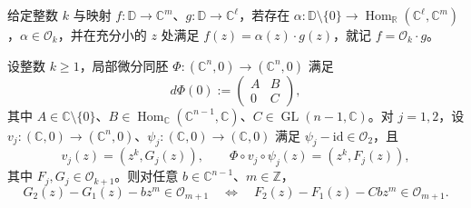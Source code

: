 给定整数 $k$ 与映射 $f:\mathbb D\to\mathbb C^m$、$g:\mathbb D\to\mathbb C^\ell$，若存在 $\alpha:\mathbb D\setminus\{0\}\to\operatorname{Hom}_{\mathbb R}(\mathbb C^\ell,\mathbb C^m)$，$\alpha\in\mathcal O_k$，并在充分小的 $z$ 处满足 $f(z)=\alpha(z)\cdot g(z)$，就记 $f=\mathcal O_k\cdot g$。

\begin{lemma}\label{lem:E-6-5}
设整数 $k\ge1$，局部微分同胚 $\Phi:(\mathbb C^n,0)\to(\mathbb C^n,0)$ 满足
\begin{equation}\label{eq:E-6-10}
  d\Phi(0):=\begin{pmatrix}A&B\\0&C\end{pmatrix},
\end{equation}
其中 $A\in\mathbb C\setminus\{0\}$、$B\in\operatorname{Hom}_{\mathbb C}(\mathbb C^{n-1},\mathbb C)$、$C\in\operatorname{GL}(n-1,\mathbb C)$。对 $j=1,2$，设 $v_j:(\mathbb C,0)\to(\mathbb C^n,0)$、$\psi_j:(\mathbb C,0)\to(\mathbb C,0)$ 满足 $\psi_j-\mathrm{id}\in\mathcal O_2$，且
\[
  v_j(z)=(z^k,G_j(z)),\qquad
  \Phi\circ v_j\circ\psi_j(z)=(z^k,F_j(z)),
\]
其中 $F_j,G_j\in\mathcal O_{k+1}$。则对任意 $b\in\mathbb C^{n-1}$、$m\in\mathbb Z$，
\[
  G_2(z)-G_1(z)-bz^m\in\mathcal O_{m+1}
  \quad\Longleftrightarrow\quad
  F_2(z)-F_1(z)-Cbz^m\in\mathcal O_{m+1}.
\]
\end{lemma}

